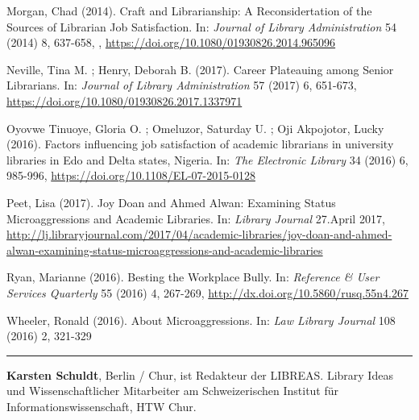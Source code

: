 \documentclass[a4paper,
fontsize=11pt,
oneside,
numbers=noperiodatend,
parskip=half-,
bibliography=totoc,
final
]{scrartcl}
\begin{document}
Morgan, Chad (2014). Craft and Librarianship: A Reconsidertation of the
Sources of Librarian Job Satisfaction. In: \emph{Journal of Library
Administration} 54 (2014) 8, 637-658, ,
\url{https://doi.org/10.1080/01930826.2014.965096}

Neville, Tina M. ; Henry, Deborah B. (2017). Career Plateauing among
Senior Librarians. In: \emph{Journal of Library Administration} 57
(2017) 6, 651-673, \url{https://doi.org/10.1080/01930826.2017.1337971}

Oyovwe Tinuoye, Gloria O. ; Omeluzor, Saturday U. ; Oji Akpojotor, Lucky
(2016). Factors influencing job satisfaction of academic librarians in
university libraries in Edo and Delta states, Nigeria. In: \emph{The
Electronic Library} 34 (2016) 6, 985-996,
\url{https://doi.org/10.1108/EL-07-2015-0128}

Peet, Lisa (2017). Joy Doan and Ahmed Alwan: Examining Status
Microaggressions and Academic Libraries. In: \emph{Library Journal}
27.April 2017,
\url{http://lj.libraryjournal.com/2017/04/academic-libraries/joy-doan-and-ahmed-alwan-examining-status-microaggressions-and-academic-libraries}

Ryan, Marianne (2016). Besting the Workplace Bully. In: \emph{Reference
\& User Services Quarterly} 55 (2016) 4, 267-269,
\url{http://dx.doi.org/10.5860/rusq.55n4.267}

Wheeler, Ronald (2016). About Microaggressions. In: \emph{Law Library
Journal} 108 (2016) 2, 321-329

\begin{center}\rule{0.5\linewidth}{\linethickness}\end{center}

\textbf{Karsten Schuldt}, Berlin / Chur, ist Redakteur der LIBREAS.
Library Ideas und Wissenschaftlicher Mitarbeiter am Schweizerischen
Institut für Informationswissenschaft, HTW Chur.
\end{document}
